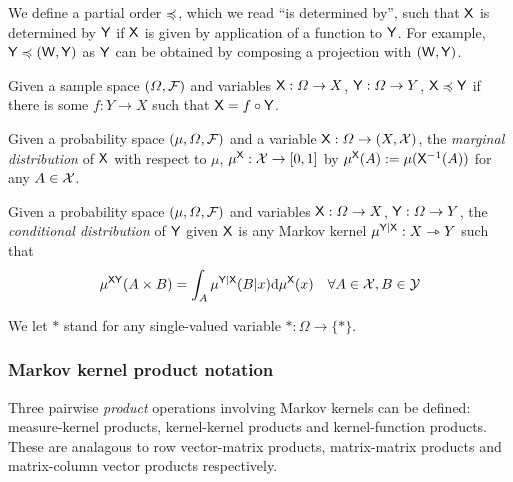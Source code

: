 We define a partial order $\preccurlyeq$, which we read ``is determined by'', such that $\mathsf{X}$ is determined by $\mathsf{Y}$ if $\mathsf{X}$ is given by application of a function to $\mathsf{Y}$. For example, $\mathsf{Y}\preccurlyeq (\mathsf{W},\mathsf{Y})$ as $\mathsf{Y}$ can be obtained by composing a projection with $(\mathsf{W},\mathsf{Y})$.

\begin{definition}\label{def:variable_po}
Given a sample space $(\Omega,\mathcal{F})$ and variables $\mathsf{X}:\Omega\to X$, $\mathsf{Y}:\Omega\to Y$, $\mathsf{X}\preccurlyeq \mathsf{Y}$ if there is some $f:Y\to X$ such that $\mathsf{X}=f\circ \mathsf{Y}$.
\end{definition}

\begin{definition}\label{def:pushforward}
Given a probability space $(\mu,\Omega,\mathcal{F})$ and a variable $\mathsf{X}:\Omega\to (X,\mathcal{X})$, the \emph{marginal distribution} of $\mathsf{X}$ with respect to $\mu$, $\mu^{\mathsf{X}}:\mathcal{X}\to [0,1]$ by $\mu^{\mathsf{X}}(A):=\mu(\mathsf{X}^{-1}(A))$ for any $A\in \mathcal{X}$.
\end{definition}

\begin{definition}\label{def:disint}
Given a probability space $(\mu,\Omega,\mathcal{F})$ and variables $\mathsf{X}:\Omega\to X$, $\mathsf{Y}:\Omega\to Y$, the \emph{conditional distribution} of $\mathsf{Y}$ given $\mathsf{X}$ is any Markov kernel $\mu^{\mathsf{Y}|\mathsf{X}}:X\rightarrowtriangle Y$ such that
\begin{align}
	\mu^{\mathsf{XY}}(A\times B)&=\int_{A} \mu^{\mathsf{Y}|\mathsf{X}}(B|x) \mathrm{d}\mu^{\mathsf{X}}(x) &\forall A\in \mathcal{X}, B\in \mathcal{Y}
\end{align}
\end{definition}

\begin{definition}\label{no:single_valued}
We let $*$ stand for any single-valued variable $*:\Omega\to \{*\}$.
\end{definition}

\subsubsection{Markov kernel product notation}\label{ssec:product_notation}

Three pairwise \emph{product} operations involving Markov kernels can be defined: measure-kernel products, kernel-kernel products and kernel-function products. These are analagous to row vector-matrix products, matrix-matrix products and matrix-column vector products respectively.

